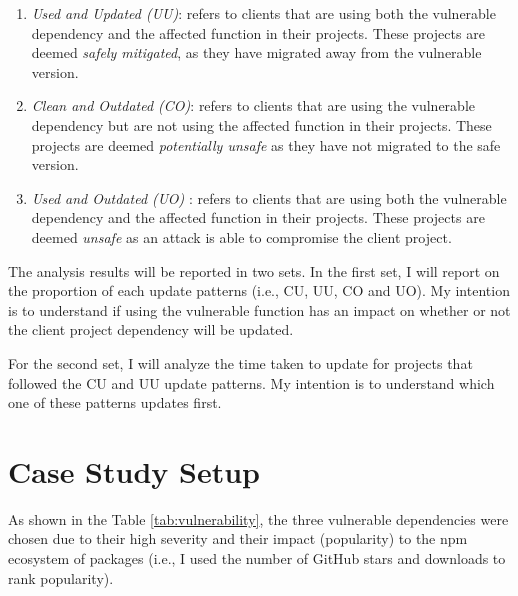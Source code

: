 \begin{itemize}
\begin{enumerate}
    \item \textit{Used and Updated (UU)}: refers to clients that are using both the vulnerable dependency and the affected function in their projects. These projects are deemed \textit{safely mitigated}, as they have migrated away from the vulnerable version. 
    
    \item \textit{Clean and Outdated (CO)}: refers to clients that are using the vulnerable dependency but are not using the affected function in their projects. These projects are deemed \textit{potentially unsafe} as they have not migrated to the safe version.
    
    \item \textit{Used and Outdated (UO)} : refers to clients that are using both the vulnerable dependency and the affected function in their projects. These projects are deemed \textit{unsafe} as an attack is able to compromise the client project.
\end{enumerate}
\end{itemize}

The analysis results will be reported in two sets. In the first set, I will report on the proportion of each update patterns (i.e., CU, UU, CO and UO). My intention is to understand if using the vulnerable function has an impact on whether or not the client project dependency will be updated.

For the second set, I will analyze the time taken to update for projects that followed the CU and UU update patterns. 
My intention is to understand which one of these patterns updates first. 

\section{Case Study Setup}
As shown in the Table \ref{tab:vulnerability}, the three vulnerable dependencies were chosen due to their high severity and their impact (popularity) to the npm ecosystem of packages (i.e., I used the number of GitHub stars and downloads to rank popularity). 

